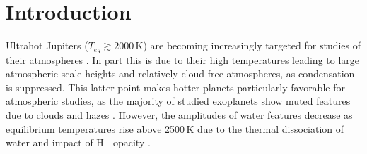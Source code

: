 \documentclass[twocolumn]{aastex63}
\begin{document}

\section{Introduction} \label{sec:intro}

Ultrahot Jupiters ($T_{eq} \gtrsim 2000$\,K) are becoming increasingly targeted for studies of their atmospheres \citep[e.g.,][]{Haynes2015,Evans2016,Evans2017,Evans2018,Nugroho2017,Sheppard2017,Arcangeli2018,Hoeijmakers2018,Lothringer2018,Lothringer2019,Hoeijmakers2019,Fu2020,Gibson2020,Changeat2021}. In part this is due to their high temperatures leading to large atmospheric scale heights and relatively cloud-free atmospheres, as condensation is suppressed. This latter point makes hotter planets particularly favorable for atmospheric studies, as the majority of studied exoplanets show muted features due to clouds and hazes \citep[e.g.,][]{Sing2016,Wakeford2019}. However, the amplitudes of water features decrease as equilibrium temperatures rise above 2500\,K due to the thermal dissociation of water and impact of H$^-$ opacity \citep[e.g.,][]{Arcangeli2018,Lothringer2018,Parmentier2018,Gao2020}.
\end{document}
